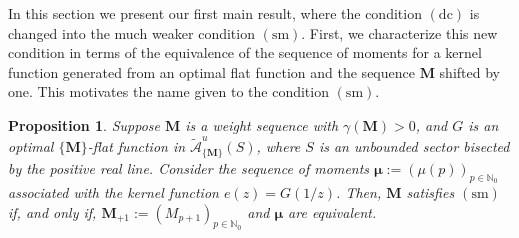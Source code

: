 \documentclass[11pt,a4paper]{article}
\theoremstyle{plain}
\newtheorem{proposition}[theorem]{Proposition}
\theoremstyle{definition}
\numberwithin{equation}{section}
\newcommand{\N}{\mathbb{N}}
\newcommand{\M}{{\boldsymbol{M}}}
\def\ga{\gamma}
\newcommand{\dc}{\operatorname{(dc)}}
\newcommand{\sm}{\operatorname{(sm)}}
\begin{document}
In this section we present our first main result, where the condition $\dc$ is changed into the much weaker condition $\sm$. First, we characterize this new condition in terms of the equivalence of the sequence of moments for a kernel function generated from an optimal flat function and the sequence $\M$ shifted by one. This motivates the name given to the condition $\sm$.

\begin{proposition}\label{prop.MomentsEquivM+1}
	Suppose $\M$ is a weight sequence with $\ga(\M)>0$, and $G$ is an optimal $\{\M\}$-flat function in $\widetilde{\mathcal{A}}^u_{\{\M\}}(S)$, where $S$ is an unbounded sector bisected by the positive real line. Consider the sequence of moments $\boldsymbol{\mu}:=(\mu(p))_{p\in\N_0}$ associated with the kernel function $e(z)=G(1/z)$. Then, $\M$ satisfies $\sm$ if, and only if, $\M_{+1}:=(M_{p+1})_{p\in\N_0}$ and $\boldsymbol{\mu}$ are equivalent.
\end{proposition}
\end{document}

